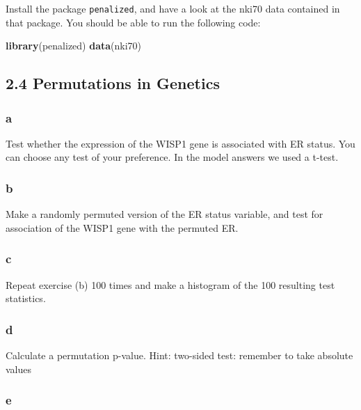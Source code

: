 \documentclass[]{article}
\newenvironment{Shaded}{\begin{snugshade}}{\end{snugshade}}
\newcommand{\KeywordTok}[1]{\textcolor[rgb]{0.13,0.29,0.53}{\textbf{#1}}}
\newcommand{\NormalTok}[1]{#1}
\begin{document}
Install the package \texttt{penalized}, and have a look at the nki70
data contained in that package. You should be able to run the following
code:

\begin{Shaded}
\begin{Highlighting}[]
\KeywordTok{library}\NormalTok{(penalized)}
\KeywordTok{data}\NormalTok{(nki70)}
\end{Highlighting}
\end{Shaded}

\hypertarget{permutations-in-genetics}{%
\subsection{2.4 Permutations in
Genetics}\label{permutations-in-genetics}}

\hypertarget{a-2}{%
\subsubsection{a}\label{a-2}}

Test whether the expression of the WISP1 gene is associated with ER
status. You can choose any test of your preference. In the model answers
we used a t-test.

\hypertarget{b-2}{%
\subsubsection{b}\label{b-2}}

Make a randomly permuted version of the ER status variable, and test for
association of the WISP1 gene with the permuted ER.

\hypertarget{c-2}{%
\subsubsection{c}\label{c-2}}

Repeat exercise (b) 100 times and make a histogram of the 100 resulting
test statistics.

\hypertarget{d-2}{%
\subsubsection{d}\label{d-2}}

Calculate a permutation p-value. Hint: two-sided test: remember to take
absolute values

\hypertarget{e-1}{%
\subsubsection{e}\label{e-1}}
\end{document}

